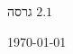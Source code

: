 
\begin{center}
\begin{bfseries}
\bigskip
\bigskip
גרסה
$2.1$

\bigskip

\today

\end{bfseries}
\end{center}
